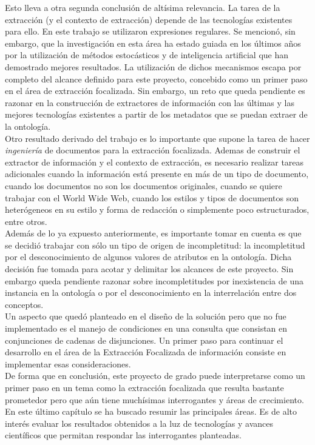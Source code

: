 Esto lleva a otra segunda conclusión de altísima relevancia. La tarea de la extracción (y el contexto de extracción) depende de las tecnologías existentes para ello. En este trabajo se utilizaron expresiones regulares. Se mencionó, sin embargo, que la investigación en esta área ha estado guiada en los últimos años por la utilización de métodos estocásticos y de inteligencia artificial que han demostrado mejores resultados. La utilización de dichos mecanismos escapa por completo del alcance definido para este proyecto, concebido como un primer paso en el área de extracción focalizada. Sin embargo, un reto que queda pendiente es razonar en la construcción de extractores de información con las últimas y las mejores tecnologías existentes a partir de los metadatos que se puedan extraer de la ontología. \\

Otro resultado derivado del trabajo es lo importante que supone la tarea de hacer \emph{ingeniería} de documentos para la extracción focalizada. Ademas de construir el extractor de información y el contexto de extracción, es necesario realizar tareas adicionales cuando la información está presente en más de un tipo de documento, cuando los documentos no son los documentos originales, cuando se quiere trabajar con el World Wide Web, cuando los estilos y tipos de documentos son heterógeneos en su estilo y forma de redacción o simplemente poco estructurados, entre otros.\\

Además de lo ya expuesto anteriormente, es importante tomar en cuenta es que se decidió trabajar con sólo un tipo de origen de incompletitud: la incompletitud por el desconocimiento de algunos valores de atributos en la ontología. Dicha decisión fue tomada para acotar y delimitar los alcances de este proyecto. Sin embargo queda pendiente razonar sobre incompletitudes por inexistencia de una instancia en la ontología o por el desconocimiento en la interrelación entre dos conceptos. \\

Un aspecto que quedó planteado en el diseño de la solución pero que no fue implementado es el manejo de condiciones en una consulta que consistan en conjunciones de cadenas de disjunciones. Un primer paso para continuar el desarrollo en el área de la Extracción Focalizada de información consiste en implementar esas consideraciones.\\

De forma que en conclusión, este proyecto de grado puede interpretarse como un primer paso en un tema como la extracción focalizada que resulta bastante prometedor pero que aún tiene muchísimas interrogantes y áreas de crecimiento. En este último capítulo se ha buscado resumir las principales áreas. Es de alto interés evaluar los resultados obtenidos a la luz de tecnologías y avances científicos que permitan respondar las interrogantes planteadas. \\